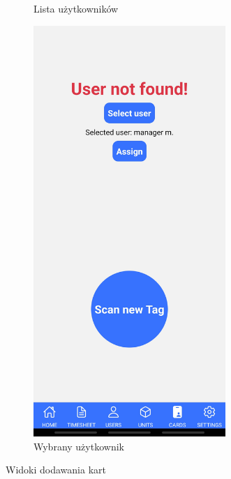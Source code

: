 \begin{figure}
\begin{subfigure}[b]{0.3\textwidth}
        \caption{Lista użytkowników}
    \end{subfigure}
    \begin{subfigure}[b]{0.3\textwidth}
        \centering
        \includegraphics[width=0.8\textwidth, frame]{graf/mobile/userSelected.jpg}
        \caption{Wybrany użytkownik}
    \end{subfigure}
    \caption{Widoki dodawania kart}
    \label{fig:cardDialogs}
\end{figure}

